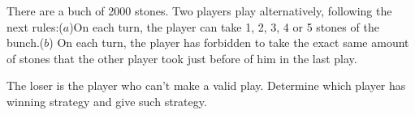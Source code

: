 There are a buch of 2000 stones. Two players play alternatively, following the next rules:($a$)On each turn, the player can take 1, 2, 3, 4 or 5 stones of the bunch.($b$) On each turn, the player has forbidden to take the exact same amount of stones that the other player took just before of him in the last play.

The loser is the player who can't make a valid play. Determine which player has winning strategy and give such strategy.